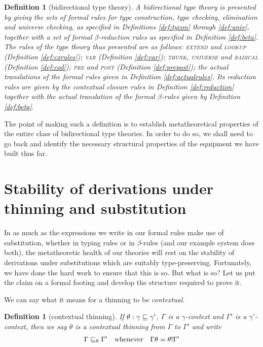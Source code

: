 \documentclass{jfp1}
\newtheorem{definition}[theorem]{Definition}
\begin{document}
\begin{definition}[bidirectional type theory]
  A bidirectional type theory is presented by giving the sets of formal
  rules for type construction, type checking, elimination and universe
  checking, as specified in Definitions \ref{def:tycon} through
  \ref{def:univ}, together with a set of formal $\beta$-reduction rules as
  specified in Definition \ref{def:beta}. The rules of the type theory thus presented
  are as follows: \textsc{extend} and \textsc{lookup} (Definition
  \ref{def:cxrules});
  \textsc{var} (Definition \ref{def:var});
  \textsc{thunk}, \textsc{universe} and \textsc{radical} (Definition
  \ref{def:cod});
  \textsc{pre} and \textsc{post} (Definition \ref{def:prepost});
  the actual translations of the formal rules given in Definition
  \ref{def:actualrules}.
  Its reduction rules are given by the contextual closure rules in
  Definition \ref{def:reduction} together with the actual translation
  of the formal $\beta$-rules given by Definition \ref{def:beta}.
\end{definition}

The point of making such a definition is to establish metatheoretical
properties of the entire class of bidirectional type theories. In
order to do so, we shall need to go back and identify the necessary
structural properties of the equipment we have built thus far.


\section{Stability of derivations under thinning and substitution}

In as much as the expressions we write in our formal rules make use of
substitution, whether in typing rules or in $\beta$-rules (and our
example system does both), the metatheoretic health of our theories
will rest on the stability of derivations under substitutions which
are suitably type-preserving. Fortunately, we have done the hard
work to ensure that this is so. But what is so? Let us put the claim
on a formal footing and develop the structure required to prove it.

We can say what it means for a thinning to be \emph{contextual}.

\begin{definition}[contextual thinning]
  If $\theta:\gamma\sqsubseteq\gamma'$, $\Gamma$ is a $\gamma$-context and
  $\Gamma'$ is a $\gamma'$-context, then we say $\theta$ is a
  \emph{contextual} thinning from $\Gamma$ to $\Gamma'$ and write
  \[
    \Gamma\sqsubseteq_\theta\Gamma'\quad \mbox{whenever}\quad
    \Gamma\theta = \theta!\Gamma'
    \]
\end{definition}
\end{document}
